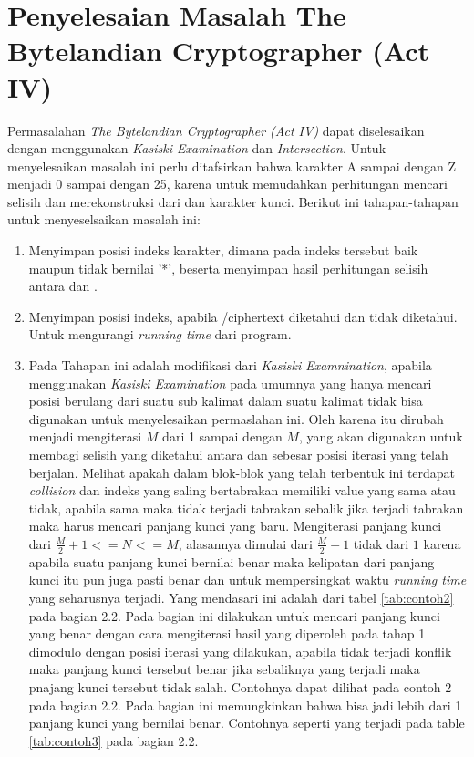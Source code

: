 	\section{Penyelesaian Masalah The Bytelandian Cryptographer (Act IV)}
	\label{chapter:solving}
	Permasalahan \textit{The Bytelandian Cryptographer (Act IV)} dapat diselesaikan dengan menggunakan \textit{Kasiski Examination} dan \textit{Intersection}. Untuk menyelesaikan masalah ini perlu ditafsirkan bahwa karakter A sampai dengan Z menjadi 0 sampai dengan 25, karena untuk memudahkan perhitungan mencari selisih dan merekonstruksi \plaintext dari \ciphertext dan karakter kunci. Berikut ini tahapan-tahapan untuk menyeselsaikan masalah ini:
	\begin{enumerate}
	\item Menyimpan posisi indeks karakter, dimana pada indeks tersebut baik \ciphertext maupun \plaintext tidak bernilai '*', beserta menyimpan hasil perhitungan selisih antara \ciphertext dan \plaintext\cite{john_jones_spoj_2009}.
	\item Menyimpan posisi indeks, apabila /ciphertext diketahui dan \plaintext tidak diketahui. Untuk mengurangi \textit{running time} dari program\cite{john_jones_spoj_2009}.
	\item Pada Tahapan ini adalah modifikasi dari \textit{Kasiski Examnination}, apabila menggunakan \textit{Kasiski Examination} pada umumnya yang hanya mencari posisi berulang dari suatu sub kalimat dalam suatu kalimat tidak bisa digunakan untuk menyelesaikan permaslahan ini. Oleh karena itu dirubah menjadi mengiterasi $M$ dari 1 sampai dengan $M$, yang akan digunakan untuk membagi selisih yang diketahui antara \plaintext dan \ciphertext sebesar posisi iterasi yang telah berjalan. Melihat apakah dalam blok-blok yang telah terbentuk ini terdapat \textit{collision} dan indeks yang saling bertabrakan memiliki value yang sama atau tidak, apabila sama maka tidak terjadi tabrakan sebalik jika terjadi tabrakan maka harus mencari panjang kunci yang baru. Mengiterasi panjang kunci dari $\frac{M}{2}+1<=N<=M$, alasannya dimulai dari $\frac{M}{2}+1$ tidak dari $1$ karena apabila suatu panjang kunci bernilai benar maka kelipatan dari panjang kunci itu pun juga pasti benar dan untuk mempersingkat waktu \textit{running time} yang seharusnya terjadi. Yang mendasari ini adalah dari tabel  \ref{tab:contoh2} pada bagian 2.2. Pada bagian ini dilakukan untuk mencari panjang kunci yang benar dengan cara mengiterasi hasil yang diperoleh pada tahap 1 dimodulo dengan posisi iterasi yang dilakukan, apabila tidak terjadi konflik maka panjang kunci tersebut benar jika sebaliknya yang terjadi maka pnajang kunci tersebut tidak salah. Contohnya dapat dilihat pada contoh 2 pada bagian 2.2. Pada bagian ini memungkinkan bahwa bisa jadi lebih dari 1 panjang kunci yang bernilai benar. Contohnya seperti yang terjadi pada table \ref{tab:contoh3} pada bagian 2.2. 

\end{enumerate}
